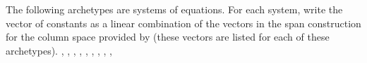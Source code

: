 The following archetypes are systems of equations.  For each system, write the vector of constants as a linear combination of the vectors in the span construction for the column space provided by  (these vectors are listed for each of these archetypes).\newline\newline
{},
,
,
,
,
,
,
,
,


